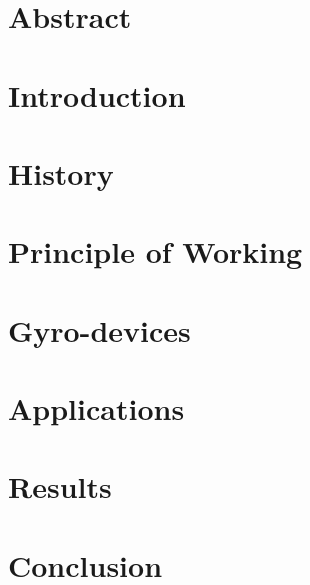 \documentclass[12pt, oneside]{report}
\date{2018}
\begin{document}


\chapter*{Abstract}


\cleardoublepage

\tableofcontents

\listoftables
\thispagestyle{empty}

\listoffigures
\thispagestyle{empty}

\chapter{Introduction}

\chapter{History}

\chapter{Principle of Working}

\chapter{Gyro-devices}

\chapter{Applications}

\chapter{Results}

\chapter{Conclusion}



\pagebreak

\end{document}
